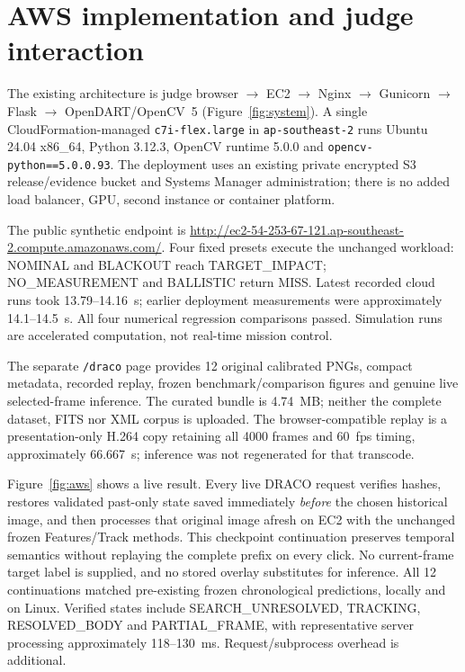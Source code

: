 \documentclass[11pt,a4paper]{article}
\begin{document}
\section{AWS implementation and judge interaction}
The existing architecture is judge browser $\rightarrow$ EC2 $\rightarrow$ Nginx $\rightarrow$ Gunicorn $\rightarrow$ Flask $\rightarrow$ OpenDART/OpenCV~5 (Figure~\ref{fig:system}). A single CloudFormation-managed \texttt{c7i-flex.large} in \texttt{ap-southeast-2} runs Ubuntu 24.04 x86\_64, Python 3.12.3, OpenCV runtime 5.0.0 and \texttt{opencv-python==5.0.0.93}. The deployment uses an existing private encrypted S3 release/evidence bucket and Systems Manager administration; there is no added load balancer, GPU, second instance or container platform.

The public synthetic endpoint is \url{http://ec2-54-253-67-121.ap-southeast-2.compute.amazonaws.com/}. Four fixed presets execute the unchanged workload: NOMINAL and BLACKOUT reach TARGET\_IMPACT; NO\_MEASUREMENT and BALLISTIC return MISS. Latest recorded cloud runs took 13.79--14.16~s; earlier deployment measurements were approximately 14.1--14.5~s. All four numerical regression comparisons passed. Simulation runs are accelerated computation, not real-time mission control.

The separate \texttt{/draco} page provides 12 original calibrated PNGs, compact metadata, recorded replay, frozen benchmark/comparison figures and genuine live selected-frame inference. The curated bundle is 4.74~MB; neither the complete dataset, FITS nor XML corpus is uploaded. The browser-compatible replay is a presentation-only H.264 copy retaining all 4000 frames and 60~fps timing, approximately 66.667~s; inference was not regenerated for that transcode.

Figure~\ref{fig:aws} shows a live result. Every live DRACO request verifies hashes, restores validated past-only state saved immediately \emph{before} the chosen historical image, and then processes that original image afresh on EC2 with the unchanged frozen Features/Track methods. This checkpoint continuation preserves temporal semantics without replaying the complete prefix on every click. No current-frame target label is supplied, and no stored overlay substitutes for inference. All 12 continuations matched pre-existing frozen chronological predictions, locally and on Linux. Verified states include SEARCH\_UNRESOLVED, TRACKING, RESOLVED\_BODY and PARTIAL\_FRAME, with representative server processing approximately 118--130~ms. Request/subprocess overhead is additional.
\end{document}
